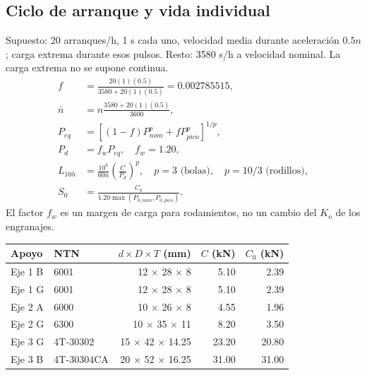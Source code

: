 \documentclass[11pt,a4paper]{article}
\begin{document}
\subsection{Ciclo de arranque y vida individual}
Supuesto: 20 arranques/h, 1 s cada uno, velocidad media durante aceleración $0.5n$; carga extrema durante esos pulsos. Resto: 3580 s/h a velocidad nominal. La carga extrema no se supone continua.
\begin{align*}
f&=\frac{20(1)(0.5)}{3580+20(1)(0.5)}=0.002785515,\\
\bar n&=n\frac{3580+20(1)(0.5)}{3600},\\
P_{eq}&=[(1-f)P_{nom}^p+fP_{pico}^p]^{1/p},\\
P_d&=f_wP_{eq},\quad f_w=1.20,\\
L_{10h}&=\frac{10^6}{60\bar n}\left(\frac C{P_d}\right)^p,
\quad p=3\text{ (bolas)},\quad p=10/3\text{ (rodillos)},\\
S_0&=\frac{C_0}{1.20\max(P_{0,nom},P_{0,pico})}.
\end{align*}
El factor $f_w$ es un margen de carga para rodamientos, no un cambio del $K_o$ de los engranajes.

\begin{center}\small\begin{tabular}{llrrr}\toprule

Apoyo & NTN & $d\times D\times T$ (mm) & $C$ (kN) & $C_0$ (kN) \\ \midrule

Eje 1 B & 6001 & 12 $\times$ 28 $\times$ 8 & 5.10 & 2.39 \\

Eje 1 G & 6001 & 12 $\times$ 28 $\times$ 8 & 5.10 & 2.39 \\

Eje 2 A & 6000 & 10 $\times$ 26 $\times$ 8 & 4.55 & 1.96 \\

Eje 2 G & 6300 & 10 $\times$ 35 $\times$ 11 & 8.20 & 3.50 \\

Eje 3 G & 4T-30302 & 15 $\times$ 42 $\times$ 14.25 & 23.20 & 20.80 \\

Eje 3 B & 4T-30304CA & 20 $\times$ 52 $\times$ 16.25 & 31.00 & 31.00 \\

\bottomrule\end{tabular}\end{center}
\end{document}
